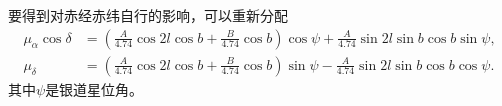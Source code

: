 \documentclass[11pt, a4paper, oneside]{ctexart}
\numberwithin{equation}{subsection}
\begin{document}
要得到对赤经赤纬自行的影响，可以重新分配
\begin{align}
\mu_\alpha\cos\delta&=\left(\frac{A}{4.74}\cos2l\cos b+\frac{B}{4.74}\cos b\right)\cos\psi+\frac{A}{4.74}\sin2l\sin b\cos b\sin\psi,\\
\mu_\delta&=\left(\frac{A}{4.74}\cos2l\cos b+\frac{B}{4.74}\cos b\right)\sin\psi-\frac{A}{4.74}\sin2l\sin b\cos b\cos\psi.
\end{align}
其中$\psi$是银道星位角。

\printbibliography
\end{document}

